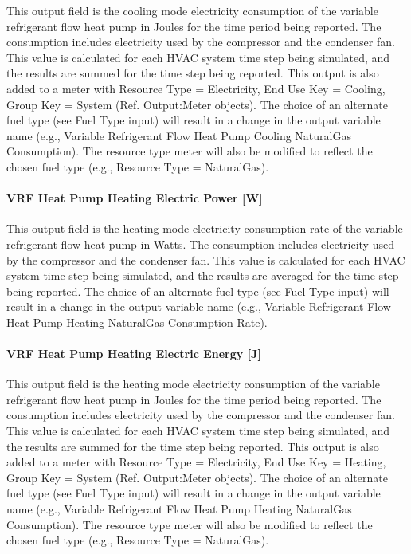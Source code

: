 This output field is the cooling mode electricity consumption of the variable refrigerant flow heat pump in Joules for the time period being reported. The consumption includes electricity used by the compressor and the condenser fan. This value is calculated for each HVAC system time step being simulated, and the results are summed for the time step being reported. This output is also added to a meter with Resource Type = Electricity, End Use Key = Cooling, Group Key = System (Ref. Output:Meter objects). The choice of an alternate fuel type (see Fuel Type input) will result in a change in the output variable name (e.g., Variable Refrigerant Flow Heat Pump Cooling NaturalGas Consumption). The resource type meter will also be modified to reflect the chosen fuel type (e.g., Resource Type = NaturalGas).

\paragraph{VRF Heat Pump Heating Electric Power {[}W{]}}\label{vrf-heat-pump-heating-electric-power-w}

This output field is the heating mode electricity consumption rate of the variable refrigerant flow heat pump in Watts. The consumption includes electricity used by the compressor and the condenser fan. This value is calculated for each HVAC system time step being simulated, and the results are averaged for the time step being reported. The choice of an alternate fuel type (see Fuel Type input) will result in a change in the output variable name (e.g., Variable Refrigerant Flow Heat Pump Heating NaturalGas Consumption Rate).

\paragraph{VRF Heat Pump Heating Electric Energy {[}J{]}}\label{vrf-heat-pump-heating-electric-energy-j}

This output field is the heating mode electricity consumption of the variable refrigerant flow heat pump in Joules for the time period being reported. The consumption includes electricity used by the compressor and the condenser fan. This value is calculated for each HVAC system time step being simulated, and the results are summed for the time step being reported. This output is also added to a meter with Resource Type = Electricity, End Use Key = Heating, Group Key = System (Ref. Output:Meter objects). The choice of an alternate fuel type (see Fuel Type input) will result in a change in the output variable name (e.g., Variable Refrigerant Flow Heat Pump Heating NaturalGas Consumption). The resource type meter will also be modified to reflect the chosen fuel type (e.g., Resource Type = NaturalGas).

